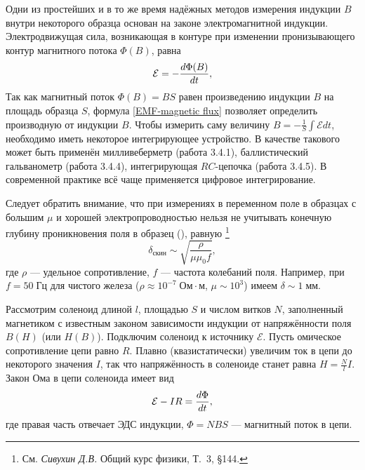 Одни из простейших и в то же время надёжных методов измерения
индукции $B$ внутри некоторого образца основан
на законе электромагнитной индукции.
Электродвижущая сила, возникающая в контуре при изменении
пронизывающего контур магнитного потока $\Phi(B)$, равна
\begin{equation}
	\eqmark{EMF-magnetic flux}
	\mathcal{E} = - \frac{d\Phi (B)}{dt},
\end{equation}
Так как магнитный поток $\Phi (B)=BS$ равен произведению индукции $B$ на площадь
образца $S$, формула \eqref{EMF-magnetic flux} позволяет определить производную от
индукции $B$. Чтобы измерить саму величину $B=-\frac1{S}\int \mathcal{E} dt$,
необходимо иметь некоторое интегрирующее устройство.
В качестве такового может быть применён милливеберметр (работа 3.4.1),
баллистический гальванометр (работа 3.4.4), интегрирующая $RC$-цепочка
(работа 3.4.5). В современной практике всё чаще применяется цифровое интегрирование.

Следует обратить внимание, что при измерениях в переменном поле
в образцах с большим $\mu$ и хорошей электропроводностью
нельзя не учитывать конечную глубину
проникновения поля в образец (), равную%
\footnote{См. \textit{Сивухин Д.В.} Общий курс физики, Т.~3, \S 144.}
\begin{equation*}
\delta_{скин} \sim \sqrt{\frac{\rho}{\mu \mu_0 f}},
\end{equation*}
где $\rho$ --- удельное сопротивление, $f$ --- частота колебаний поля.
Например, при $f=50\;Гц$ для чистого железа ($\rho \approx 10^{-7}\;Ом\cdot м$,
$\mu \sim 10^3$) имеем $\delta \sim 1\;мм$.


\label{sec:forces}


Рассмотрим соленоид длиной $l$, площадью $S$ и числом витков $N$,
заполненный магнетиком с известным законом зависимости индукции от напряжённости
поля $B(H)$ (или $H(B)$). Подключим соленоид к источнику $\mathcal{E}$.
Пусть омическое сопротивление цепи равно $R$.
Плавно (квазистатически) увеличим ток в цепи до некоторого значения
$I$, так что напряжённость в соленоиде станет равна
$H = \frac{N}{l} I$. Закон Ома в цепи соленоида имеет вид
\begin{equation}
    \eqmark{OhmLaw-solenoid}
\mathcal{E} - IR = \frac{d\Phi}{dt},
\end{equation}
где правая часть отвечает ЭДС индукции, $\Phi = NBS$ --- магнитный поток в
цепи.

